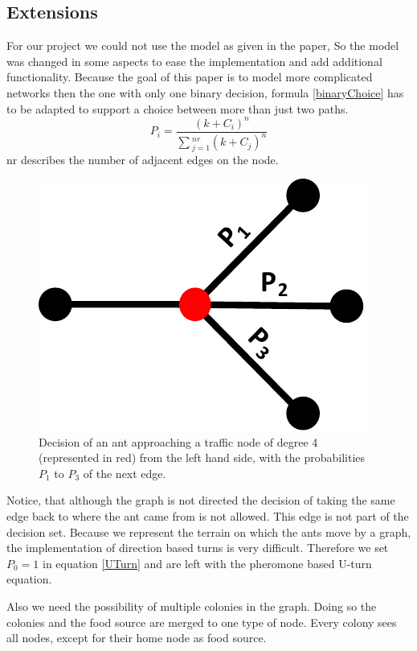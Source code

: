 \subsection{Extensions}
 For our project we could not use the model as given in the paper, So the model was changed in some aspects to ease the implementation and add additional functionality. Because the goal of this paper is to model more complicated networks then the one with only one binary decision, formula \ref{binaryChoice} has to be adapted to support a choice between more than just two paths. 
\begin{equation} \label{multiDecisions}
P_i = \frac{(k+C_i)^n}{\sum{_{j=1}^{nr}(k+C_j)^n}}
\end{equation}  
 nr describes the number of adjacent edges on the node.
\begin{figure}[H]
	\centering
	\includegraphics[scale=0.5]{decision3.pdf}
	\caption{Decision of an ant approaching a traffic node of degree 4 (represented in red) from the left hand side, with the probabilities $P_1$ to $P_3$ of the next edge.}
\end{figure}
Notice, that although the graph is not directed the decision of taking the same edge back to where the ant came from is not allowed. This edge is not part of the decision set.
Because we represent the terrain on which the ants move by a graph, the implementation of direction based turns is very difficult. Therefore we set $P_0 = 1$ in equation \ref{UTurn} and are left with the pheromone based U-turn equation.

Also we need the possibility of multiple colonies in the graph. Doing so the colonies and the food source are merged to one type of node. Every colony sees all nodes, except for their home node as food source. 

